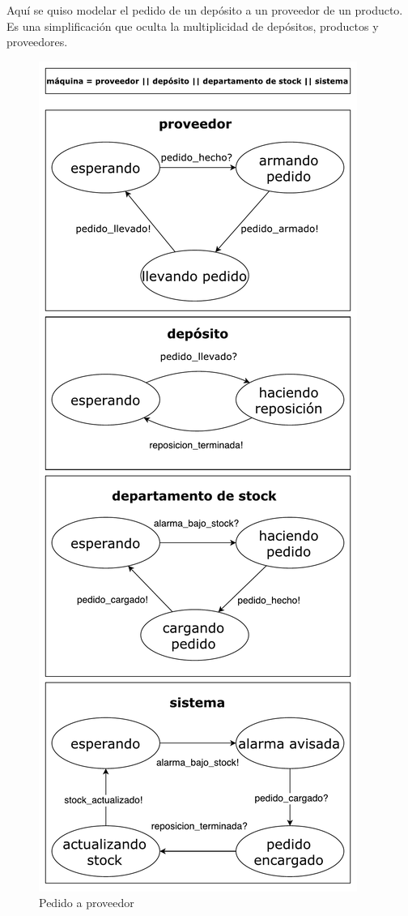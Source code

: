 Aquí se quiso modelar el pedido de un depósito a un proveedor de un producto.
Es una simplificación que oculta la multiplicidad de depósitos, productos y
proveedores.

\begin{figure}[H]
  \begin{center}
  \includegraphics[height=.9\textheight]{tp2/images/fsm-pedido-a-proveedor.pdf}
  \end{center}
  \caption{Pedido a proveedor}
  \label{fsm:proveedor}
\end{figure}
